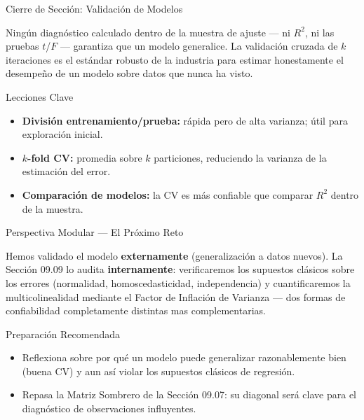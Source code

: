 \documentclass[10pt, aspectratio=169]{beamer}
\begin{document}
\begin{frame}{Cierre de Sección: Validación de Modelos}
  \begin{reflexion}
    Ningún diagnóstico calculado dentro de la muestra de ajuste --- ni $R^2$, ni las pruebas $t$/$F$ --- garantiza que un modelo generalice. La validación cruzada de $k$ iteraciones es el estándar robusto de la industria para estimar honestamente el desempeño de un modelo sobre datos que nunca ha visto.
  \end{reflexion}

  \vspace{0.2cm}
  \pause
  \begin{block}{Lecciones Clave}
    \begin{itemize}\itemsep=0.08cm
      \item \textbf{División entrenamiento/prueba:} rápida pero de alta varianza; útil para exploración inicial.
      \item \textbf{$k$-fold CV:} promedia sobre $k$ particiones, reduciendo la varianza de la estimación del error.
      \item \textbf{Comparación de modelos:} la CV es más confiable que comparar $R^2$ dentro de la muestra.
    \end{itemize}
  \end{block}
\end{frame}

\begin{frame}{Perspectiva Modular --- El Próximo Reto}
  \scriptsize
  \begin{retoclase}
    Hemos validado el modelo \textbf{externamente} (generalización a datos nuevos). La Sección 09.09 lo audita \textbf{internamente}: verificaremos los supuestos clásicos sobre los errores (normalidad, homoscedasticidad, independencia) y cuantificaremos la multicolinealidad mediante el Factor de Inflación de Varianza --- dos formas de confiabilidad completamente distintas mas complementarias.
  \end{retoclase}

  \vspace{0.08cm}
  \pause
  \begin{alertblock}{Preparación Recomendada}
    \begin{itemize}\itemsep=0.06cm
      \item Reflexiona sobre por qué un modelo puede generalizar razonablemente bien (buena CV) y aun así violar los supuestos clásicos de regresión.
      \item Repasa la Matriz Sombrero de la Sección 09.07: su diagonal será clave para el diagnóstico de observaciones influyentes.
    \end{itemize}
  \end{alertblock}
\end{frame}
\end{document}
